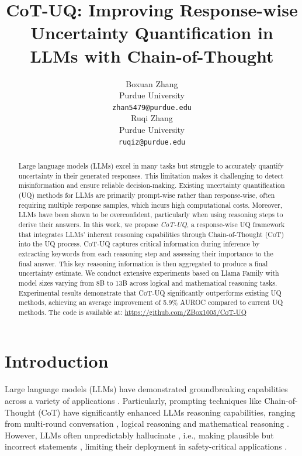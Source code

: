\documentclass[11pt]{article}
\title{CoT-UQ: Improving Response-wise Uncertainty Quantification in LLMs with Chain-of-Thought}
\author{Boxuan Zhang \\
  Purdue University \\
  \texttt{zhan5479@purdue.edu} \\\And
  Ruqi Zhang \\
  Purdue University \\
  \texttt{ruqiz@purdue.edu} \\}
\begin{document}
\maketitle
\begin{abstract}
Large language models (LLMs) excel in many tasks but struggle to accurately quantify uncertainty in their generated responses. This limitation makes it challenging to detect misinformation and ensure reliable decision-making.
Existing uncertainty quantification (UQ) methods for LLMs are primarily prompt-wise rather than response-wise, often requiring multiple response samples, which incurs high computational costs. Moreover, LLMs have been shown to be overconfident, particularly when using reasoning steps to derive their answers.
In this work, we propose \emph{CoT-UQ}, a response-wise UQ framework that integrates LLMs’ inherent reasoning capabilities through Chain-of-Thought (CoT) into the UQ process. CoT-UQ captures critical information during inference by extracting keywords from each reasoning step and assessing their importance to the final answer. This key reasoning information is then aggregated to produce a final uncertainty estimate.
We conduct extensive experiments based on Llama Family with model sizes varying from 8B to 13B across logical and mathematical reasoning tasks.
Experimental results demonstrate that CoT-UQ significantly outperforms existing UQ methods, achieving an average improvement of 5.9\% AUROC compared to current UQ methods.
The code is available at: \url{https://github.com/ZBox1005/CoT-UQ}
\end{abstract}

\section{Introduction}
\label{sec: intro}
Large language models (LLMs) have demonstrated groundbreaking capabilities across a variety of applications \citep{ouyang2022training, chowdhery2023palm, openai2024b, guo2025deepseek}. Particularly, prompting techniques like Chain-of-Thought (CoT) \citep{wei2022chain} have significantly enhanced LLMs reasoning capabilities, ranging from multi-round conversation \citep{long2023large, chen2023chatcot}, logical reasoning \citep{creswell2022selection, duan2024gtbench} and mathematical reasoning \citep{yao2024tree, shao2024deepseekmath}. However, LLMs often unpredictably hallucinate \citep{manakul2023selfcheckgpt}, i.e., making plausible but incorrect statements \citep{ji2023survey}, limiting their deployment in safety-critical applications \citep{clusmann2023future}.
\end{document}
